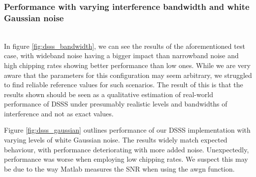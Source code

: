 		
		\subsubsection{Performance with varying interference bandwidth and white Gaussian noise}~\\
		
	In figure \ref{fig:dsss_bandwidth}, we can see the results of the aforementioned test case, with wideband noise having a bigger impact than narrowband noise and high chipping rates showing better performance than low ones. While we are very aware that the parameters for this configuration may seem arbitrary, we struggled to find reliable reference values for such scenarios. The result of this is that the results shown should be seen as a qualitative estimation of real-world performance of DSSS under presumably realistic levels and bandwidths of interference and not as exact values. 
	
	Figure \ref{fig:dsss_gaussian} outlines performance of our DSSS implementation with varying levels of white Gaussian noise. The results widely match expected behaviour, with performance deteriorating with more added noise. Unexpectedly, performance was worse when employing low chipping rates. We suspect this may be due to the way Matlab measures the SNR when using the awgn function.
	
